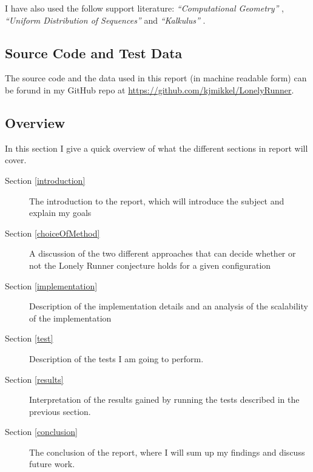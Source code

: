 I have also used the follow support literature:
\emph{``Computational Geometry''} \cite{citeulike:3347056}, \emph{``Uniform Distribution of Sequences''} \cite{uniform} and \emph{``Kalkulus''} \cite{kalkulus}.

\subsection{Source Code and Test Data}
The source code and the data used in this report (in machine readable form) can be forund in my GitHub repo at \underline{https://github.com/kjmikkel/LonelyRunner}.

\subsection{Overview}
In this section I give a quick overview of what the different sections in report will cover.
\begin{description}
\item[Section \ref{introduction}] The introduction to the report, which will introduce the subject and explain my goals
\item[Section \ref{choiceOfMethod}] A discussion of the two different approaches that can decide whether or not the Lonely Runner conjecture holds for a given configuration
\item[Section \ref{implementation}] Description of the implementation details and an analysis of the scalability of the implementation
\item[Section \ref{test}] Description of the tests I am going to perform.
\item[Section \ref{results}] Interpretation of the results gained by running the tests described in the previous section.
\item[Section \ref{conclusion}] The conclusion of the report, where I will sum up my findings and discuss future work.
\end{description}
